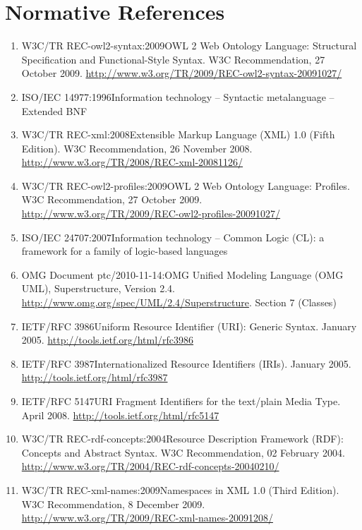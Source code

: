 \documentclass[10pt,%
\ifpretendfinal
final%
\else
draft%
\fi,
]{scrreprt}
\begin{document}
\chapter{Normative References}
\begin{enumerate}
  \item{W3C/TR REC-owl2-syntax:2009}{OWL 2 Web Ontology Language: Structural Specification and Functional-Style Syntax. W3C Recommendation, 27 October 2009. \url{http://www.w3.org/TR/2009/REC-owl2-syntax-20091027/}}
  \item{ISO/IEC 14977:1996}{Information technology – Syntactic metalanguage – Extended BNF}
  \item{W3C/TR REC-xml:2008}{Extensible Markup Language (XML) 1.0 (Fifth Edition). W3C Recommendation, 26 November 2008. \url{http://www.w3.org/TR/2008/REC-xml-20081126/}}
  \item{W3C/TR REC-owl2-profiles:2009}{OWL 2 Web Ontology Language: Profiles. W3C Recommendation, 27 October 2009. \url{http://www.w3.org/TR/2009/REC-owl2-profiles-20091027/}}
  \item{ISO/IEC 24707:2007}{Information technology – Common Logic (CL): a framework for a family of logic-based languages}
  \item{OMG Document ptc/2010-11-14:}{OMG Unified Modeling Language (OMG UML), Superstructure, Version 2.4. \url{http://www.omg.org/spec/UML/2.4/Superstructure}. Section 7 (Classes)}
  \item{IETF/RFC 3986}{Uniform Resource Identifier (URI): Generic Syntax. January 2005. \url{http://tools.ietf.org/html/rfc3986}}
  \item{IETF/RFC 3987}{Internationalized Resource Identifiers (IRIs). January 2005. \url{http://tools.ietf.org/html/rfc3987}}
  \item{IETF/RFC 5147}{URI Fragment Identifiers for the text/plain Media Type.  April 2008. \url{http://tools.ietf.org/html/rfc5147}}
  \item{W3C/TR REC-rdf-concepts:2004}{Resource Description Framework (RDF): Concepts and Abstract Syntax.  W3C Recommendation, 02 February 2004.  \url{http://www.w3.org/TR/2004/REC-rdf-concepts-20040210/}}
  \item{W3C/TR REC-xml-names:2009}{Namespaces in XML 1.0 (Third Edition). W3C Recommendation, 8 December 2009. \url{http://www.w3.org/TR/2009/REC-xml-names-20091208/}}

\end{enumerate}
\end{document}
